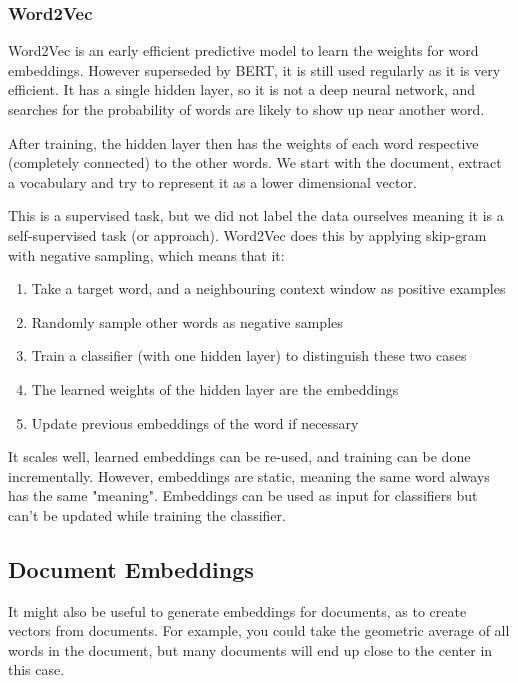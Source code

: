 \subsubsection{Word2Vec}

Word2Vec is an early efficient predictive model to learn the weights
for word embeddings. However superseded by BERT, it is still
used regularly as it is very efficient. It has a single hidden layer,
so it is not a deep neural network, and searches for the probability
of words are likely to show up near another word.

After training, the hidden layer then has the weights of each word
respective (completely connected) to the other words. We start with
the document, extract a vocabulary and try to represent it as a lower
dimensional vector.

This is a supervised task, but we did not label the data ourselves meaning
it is a self-supervised task (or approach).
Word2Vec does this by applying skip-gram with negative sampling, which
means that it:

\begin{enumerate}
  \item Take a target word, and a neighbouring context window as
    positive examples
  \item Randomly sample other words as negative samples
  \item Train a classifier (with one hidden layer) to distinguish
    these two cases
  \item The learned weights of the hidden layer are the embeddings
  \item Update previous embeddings of the word if necessary
\end{enumerate}

It scales well, learned embeddings can be re-used, and training can be done
incrementally. However, embeddings are static, meaning the same word always
has the same "meaning". Embeddings can be used as input for classifiers but
can't be updated while training the classifier.

\subsection{Document Embeddings}

It might also be useful to generate embeddings for documents, as to create
vectors from documents. For example, you could take the geometric average of
all words in the document, but many documents will end up close to the center
in this case.

